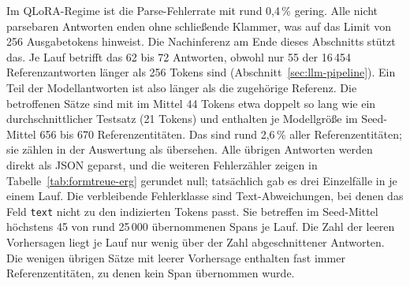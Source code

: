 \begin{table}[htbp]
  \centering
  \footnotesize
  \caption[Formtreue der LLM-Ausgaben auf dem Testsplit]{Formtreue der
  LLM-Ausgaben auf dem Testsplit (16\,454 Antworten); Kennzahlen und
  Zählweise nach Tabelle~\ref{tab:formtreue} und
  Abschnitt~\ref{sec:robustheit-ausgaben} (QLoRA: Mittel über drei
  Seeds, gerundet).
  Zusätzlich: Referenzentitäten in nicht parsebaren Antworten (Anteil
  aller Referenzentitäten); begonnene Elemente (in der Rohausgabe
  begonnene JSON-Objekte, Näherung über öffnende geschweifte Klammern,
  einschließlich abgeschnittener); übernommene Spans (Elemente, die alle
  Prüfungen bestanden haben); leere Vorhersagen (Sätze ohne übernommenen
  Span, unabhängig von der Ursache; acht Testsätze enthalten keine
  Referenzentität).}
  \label{tab:formtreue-erg}
  \setlength{\tabcolsep}{4pt}
  
\end{table}

Im QLoRA-Regime ist die Parse-Fehlerrate mit rund 0,4\,\% gering.
Alle nicht parsebaren Antworten enden ohne schließende Klammer, was auf
das Limit von 256 Ausgabetokens hinweist. Die Nachinferenz am Ende
dieses Abschnitts stützt das.
Je Lauf betrifft das 62 bis 72 Antworten, obwohl nur 55 der
16\,454 Referenzantworten länger als 256 Tokens sind
(Abschnitt~\ref{sec:llm-pipeline}). Ein Teil der Modellantworten ist
also länger als die zugehörige Referenz.
Die betroffenen Sätze sind mit im Mittel 44 Tokens etwa doppelt so lang
wie ein durchschnittlicher Testsatz (21 Tokens) und enthalten je
Modellgröße im Seed-Mittel 656 bis 670 Referenzentitäten.
Das sind rund 2,6\,\% aller Referenzentitäten; sie zählen in der
Auswertung als übersehen.
Alle übrigen Antworten werden direkt als JSON geparst, und die weiteren
Fehlerzähler zeigen in Tabelle~\ref{tab:formtreue-erg} gerundet null;
tatsächlich gab es drei Einzelfälle in je einem Lauf.
Die verbleibende Fehlerklasse sind Text-Abweichungen, bei denen das Feld
\texttt{text} nicht zu den indizierten Tokens passt. Sie betreffen im
Seed-Mittel höchstens 45 von rund 25\,000 übernommenen Spans je Lauf.
Die Zahl der leeren Vorhersagen liegt je Lauf nur wenig über der Zahl
abgeschnittener Antworten.
Die wenigen übrigen Sätze mit leerer Vorhersage enthalten
fast immer Referenzentitäten, zu denen
kein Span übernommen wurde.


